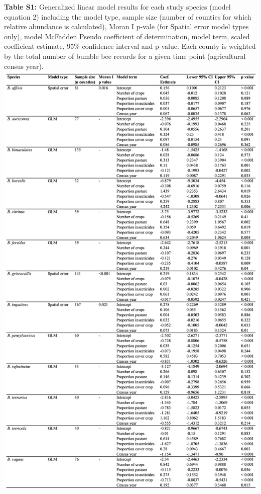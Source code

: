 \documentclass[11pt,]{article}
\begin{document}
\newpage

\textbf{Table S1:} Generalized linear model results for each study
species (model equation 2) including the model type, sample size (number
of counties for which relative abundance is calculated), Moran I p-vale
(for Spatial error model types only), model McFadden Pseudo coefficient
of determination, model term, scaled coefficient estimate, 95\%
confidence interval and p-value. Each county is weighted by the total
number of bumble bee records for a given time point (agricultural census
year).
\includegraphics[width=1\textwidth,height=\textheight]{../ms_figs/table_s2.png}
\clearpage
\end{document}
